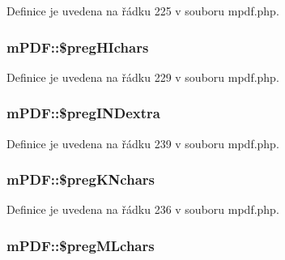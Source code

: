 Definice je uvedena na řádku 225 v souboru mpdf.\-php.

\hypertarget{classm_p_d_f_ac1139bb99f29c2911398885c2863c617}{
\subsubsection[{\$preg\-H\-Ichars}]{\setlength{\rightskip}{0pt plus 5cm}m\-P\-D\-F\-::\$preg\-H\-Ichars}}\label{classm_p_d_f_ac1139bb99f29c2911398885c2863c617}


Definice je uvedena na řádku 229 v souboru mpdf.\-php.

\hypertarget{classm_p_d_f_a06968b70c36e9084ad9d6b47e9093c79}{
\subsubsection[{\$preg\-I\-N\-Dextra}]{\setlength{\rightskip}{0pt plus 5cm}m\-P\-D\-F\-::\$preg\-I\-N\-Dextra}}\label{classm_p_d_f_a06968b70c36e9084ad9d6b47e9093c79}


Definice je uvedena na řádku 239 v souboru mpdf.\-php.

\hypertarget{classm_p_d_f_a2b37008e281828997aaa6fb1593b63db}{
\subsubsection[{\$preg\-K\-Nchars}]{\setlength{\rightskip}{0pt plus 5cm}m\-P\-D\-F\-::\$preg\-K\-Nchars}}\label{classm_p_d_f_a2b37008e281828997aaa6fb1593b63db}


Definice je uvedena na řádku 236 v souboru mpdf.\-php.

\hypertarget{classm_p_d_f_a2a83d5eb58c105e5d89ff9203619141e}{
\subsubsection[{\$preg\-M\-Lchars}]{\setlength{\rightskip}{0pt plus 5cm}m\-P\-D\-F\-::\$preg\-M\-Lchars}}\label{classm_p_d_f_a2a83d5eb58c105e5d89ff9203619141e}


